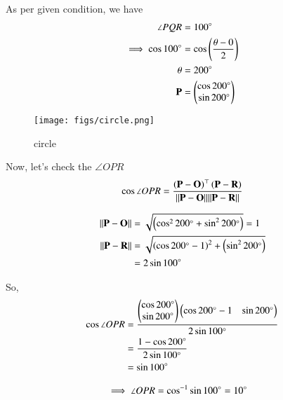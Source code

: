 \documentclass[journal,12pt,twocolumn]{IEEEtran}
\let\vec\mathbf
\begin{document}
As per given condition, we have
\begin{align}
    \angle{PQR}                          & = 100\degree                                                                                                      \\
    \implies \cos100\degree & =  \cos \brak{\frac{\theta - 0}{2}}\\
    \theta  & =   200\degree                \\
    \vec{P} & = \myvec{\cos200\degree \\ \sin200\degree}
\end{align}

\begin{figure}[!htb]
    \centering
    \texttt{[image: figs/circle.png]}
    \caption{circle}
    \label{fig:circle}
\end{figure}

Now, let's check the $\angle{OPR}$
\begin{align}
    \cos\angle{OPR} = \frac{\brak{\vec{P}-\vec{O}}^{\top} \brak{\vec{P}-\vec{R}}}{\norm{\vec{P}-\vec{O}}\norm{\vec{P}-\vec{R}}}\\
\end{align}

\begin{align}
    \norm{\vec{P}-\vec{O}} &= \sqrt{\brak{\cos^2 200\degree + \sin^2 200\degree}} = 1\\
    \norm{\vec{P}-\vec{R}} &= \sqrt{\brak{\cos200\degree - 1}^2 + \brak{\sin^2 200\degree}}\\
    &= 2\sin100\degree
\end{align}

So,
\begin{align}
    \cos\angle{OPR} &= \frac{\begin{pmatrix}\cos200\degree\\\sin200\degree\end{pmatrix}\begin{pmatrix}\cos200\degree - 1&\sin200\degree\end{pmatrix}}{2\sin100\degree}\\
    &= \frac{1 - \cos200\degree}{2\sin100\degree}\\
    &= \sin100\degree
\end{align}

\begin{align}
    \implies \angle{OPR} &= \cos^{-1} \sin100\degree = 10\degree
\end{align}
\end{document}
